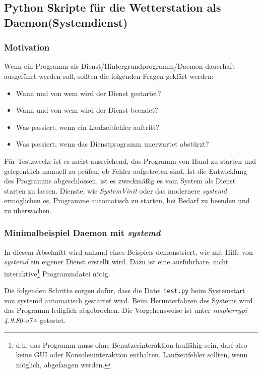 %




\subsection{Python Skripte für die Wetterstation als Daemon(Systemdienst)}
\subsubsection{Motivation}
Wenn ein Programm als Dienst/Hintergrundprogramm/Daemon dauerhaft ausgeführt werden soll, sollten die folgenden Fragen geklärt werden:
\begin{itemize}
	\item Wann und von wem wird der Dienst gestartet?
	\item Wann und von wem wird der Dienst beendet?
	\item Was passiert, wenn ein Laufzeitfehler auftritt?
	\item Was passiert, wenn das Dienstprogramm unerwartet abstürzt?
\end{itemize}

Für Testzwecke ist es meist ausreichend, das Programm von Hand zu starten und gelegentlich manuell zu prüfen, ob Fehler aufgetreten sind. Ist die Entwicklung des Programms abgeschlossen, ist es zweckmäßig es vom System als Dienst starten zu lassen. Dienste, wie \textit{SystemVinit} oder das modernere \textit{systemd} ermöglichen es, Programme automatisch zu starten, bei Bedarf zu beenden und zu überwachen.

\subsubsection{Minimalbeispiel Daemon mit \textit{systemd}}
In diesem Abschnitt wird anhand eines Beispiels demonstriert, wie mit Hilfe von \textit{systemd} ein eigener Dienst erstellt wird. Dazu ist eine ausführbare, nicht interaktive\footnote{d.h. das Programm muss ohne Benutzerinteraktion lauffähig sein, darf also keine GUI oder Konsoleninteraktion enthalten. Laufzeitfehler sollten, wenn möglich, abgefangen werden.} Programmdatei nötig.

Die folgenden Schritte sorgen dafür, dass die Datei \texttt{test.py} beim Systemstart von systemd automatisch gestartet wird. Beim Herunterfahren des Systems wird das Programm lediglich abgebrochen. Die Vorgehensweise ist unter \textit{raspberrypi 4.9.80-v7+} getestet.

